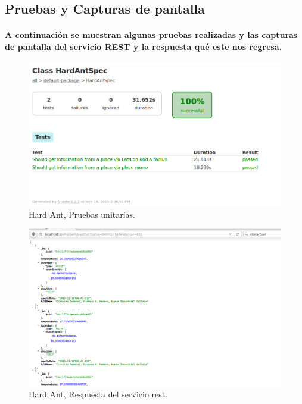   \subsection{Pruebas y Capturas de pantalla}
    \paragraph{A continuación se muestran algunas pruebas realizadas y las capturas de pantalla del servicio REST y la respuesta qué este nos regresa.}
      \begin{figure}[h!]
        \centering
          \includegraphics[width=\textwidth]{./images/PruebasHardAnt}
          \caption{Hard Ant, Pruebas unitarias.}
      \end{figure}
      \begin{figure}[h!]
        \centering
          \includegraphics[width=\textwidth]{./images/CapturaHardAnt}
          \caption{Hard Ant, Respuesta del servicio rest.}
      \end{figure}
